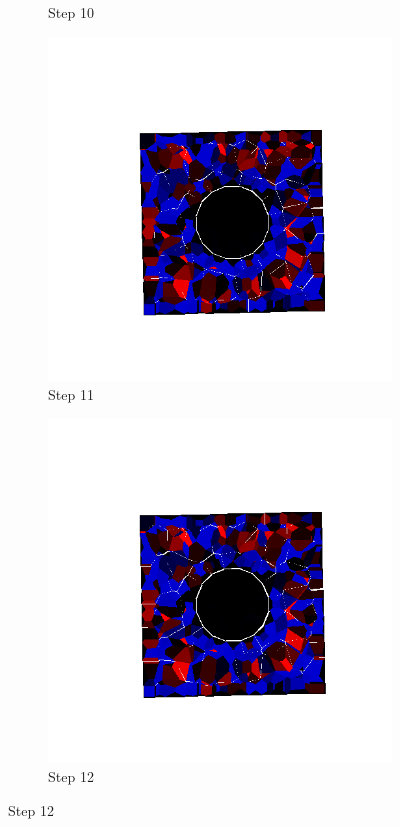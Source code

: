 \begin{figure}[ht!]
\begin{subfigure}{.25\textwidth}
      \caption{Step 10}
      \end{subfigure}%
      \begin{subfigure}{.25\textwidth}
        \centering
        \includegraphics[width=1.0\linewidth]{Files/Small_DEF/IS/DEP5-STEP(011).png}
      \caption{Step 11}
      \end{subfigure}%
      \begin{subfigure}{.25\textwidth}
        \centering
        \includegraphics[width=1.0\linewidth]{Files/Small_DEF/IS/DEP5-STEP(012).png}
      \caption{Step 12}
      \end{subfigure}


\end{figure}
